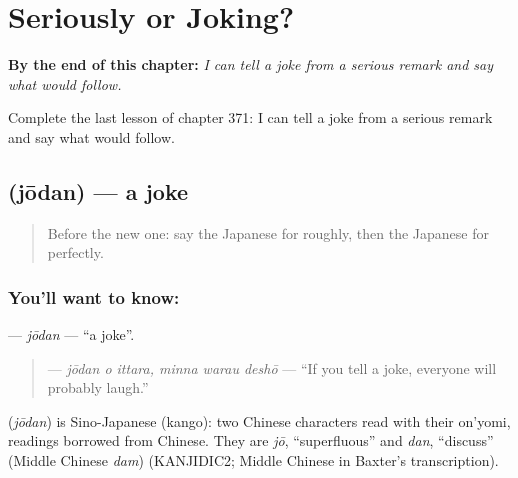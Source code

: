 
\chapter{Seriously or Joking?}
\label{ch:ja-seriously-or-joking}

\begin{chapteropening}
\textbf{By the end of this chapter:} \emph{I can tell a joke from a serious remark and say what would follow.}

Complete the last lesson of chapter 371: I can tell a joke from a serious remark and say what would follow.
\end{chapteropening}

\section[\texorpdfstring{\ja{じょうだん} (jōdan)}{じょうだん (jōdan)}]{ (jōdan) — a joke}

\label{lesson:JA-C371-joudan}



\begin{quote}
Before the new one: say the Japanese for roughly, then the Japanese for perfectly.
\end{quote}

\subsection*{You'll want to know: }
\textbf{} — \emph{jōdan} — \textquotedblleft{}a joke\textquotedblright{}.

\begin{quote}
\textbf{  } — \emph{jōdan o ittara, minna warau deshō} — \textquotedblleft{}If you tell a joke, everyone will probably laugh.\textquotedblright{}
\end{quote}

\begin{cousinweb}
\textbf{} (\emph{jōdan}) is Sino-Japanese (kango): two Chinese characters read with their on'yomi, readings borrowed from Chinese. They are \emph{jō}, \textquotedblleft{}superfluous\textquotedblright{} and \emph{dan}, \textquotedblleft{}discuss\textquotedblright{} (Middle Chinese \emph{dam}) (KANJIDIC2; Middle Chinese in Baxter's transcription).
\end{cousinweb}

